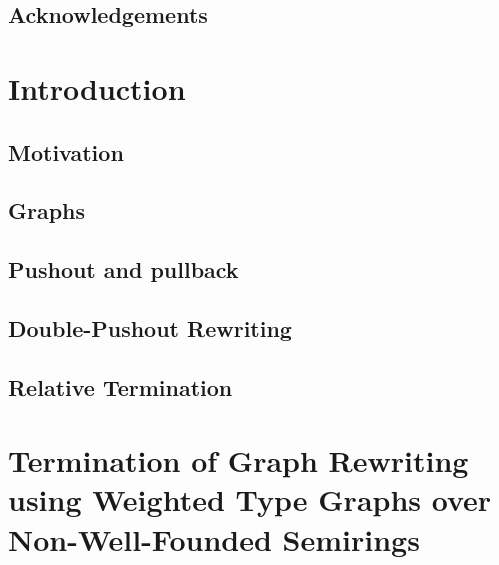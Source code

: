\documentclass{report}
\begin{document}
  
  
  
 
\section*{Acknowledgements}

\newpage       


\tableofcontents  
\newpage      
 
\chapter{Introduction}
\section{Motivation} 

\section{Graphs}
 
\section{Pushout and pullback}  

\section{Double-Pushout Rewriting}
 
\section{Relative Termination}



\chapter{Termination of Graph Rewriting
using Weighted Type Graphs
over Non-Well-Founded Semirings} 
\label{chap:nwf_type_graph}

\end{document}
